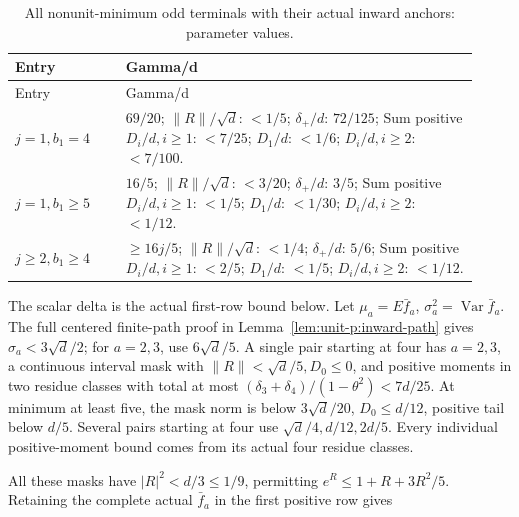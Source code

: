 \begingroup\small
\setlength{\tabcolsep}{3pt}
\setlength{\LTleft}{0pt}\setlength{\LTright}{\fill}
\begin{longtable}{@{}p{0.2200\linewidth}p{0.7000\linewidth}@{}}
\caption{All nonunit-minimum odd terminals with their actual inward anchors: parameter values.}\label{tab:parameters:q5-c181:2}\\
\toprule
Entry & Gamma/d \\
\midrule\endfirsthead
\toprule
Entry & Gamma/d \\
\midrule\endhead
\bottomrule\endfoot
\(j=1,\allowbreak b_1=4\) & \(69/20\); \(\lVert R\rVert /\sqrt{d}\): \(<1/5\); \(\delta_+/d\): \(72/125\); Sum positive \(D_i/d,\allowbreak  i\ge 1\): \(<7/25\); \(D_1/d\): \(<1/6\); \(D_i/d,\allowbreak  i\ge 2\): \(<7/100\). \\
\addlinespace[2pt]
\(j=1,\allowbreak b_1\ge 5\) & \(16/5\); \(\lVert R\rVert /\sqrt{d}\): \(<3/20\); \(\delta_+/d\): \(3/5\); Sum positive \(D_i/d,\allowbreak  i\ge 1\): \(<1/5\); \(D_1/d\): \(<1/30\); \(D_i/d,\allowbreak  i\ge 2\): \(<1/12\). \\
\addlinespace[2pt]
\(j\ge 2,\allowbreak b_1\ge 4\) & \(\ge 16j/5\); \(\lVert R\rVert /\sqrt{d}\): \(<1/4\); \(\delta_+/d\): \(5/6\); Sum positive \(D_i/d,\allowbreak  i\ge 1\): \(<2/5\); \(D_1/d\): \(<1/5\); \(D_i/d,\allowbreak  i\ge 2\): \(<1/12\). \\
\end{longtable}
\endgroup


The scalar delta is the actual first-row bound below. Let \(\mu_a=E\bar f_a\), \(\sigma_a^2=\operatorname{\operatorname{Var}}\bar f_a\). The full centered finite-path proof in Lemma~\ref{lem:unit-p:inward-path} gives \(\sigma_a<3\sqrt d/2\); for \(a=2,\allowbreak \allowbreak  3\), use \(6\sqrt d/5\). A single pair starting at four has \(a=2,\allowbreak \allowbreak  3\), a continuous interval mask with \(\|R\|<\sqrt d/5,\allowbreak \allowbreak  D_0\le0\), and positive moments in two residue classes with total at most \((\delta_3+\delta_4)/(1-\theta^2)<7d/25\). At minimum at least five, the mask norm is below \(3\sqrt d/20\), \(D_0\le d/12\), positive tail below \(d/5\). Several pairs starting at four use \(\sqrt d/4,\allowbreak \allowbreak  d/12,\allowbreak \allowbreak  2d/5\). Every individual positive-moment bound comes from its actual four residue classes.

All these masks have \(|R|^2<d/3\le1/9\), permitting \(e^R\le1+R+3R^2/5\). Retaining the complete actual \(\bar f_a\) in the first positive row gives

